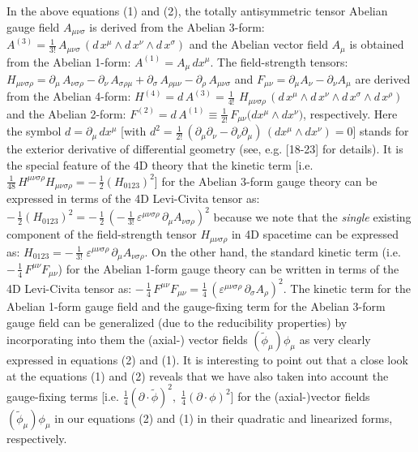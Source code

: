 \documentclass[12pt]{article}
\begin{document}
In the above equations (1) and (2), the totally antisymmetric tensor Abelian gauge field $A_{\mu\nu\sigma}$ is derived from the Abelian 3-form:
$A^{(3)} = \frac{1}{3!}\,A_{\mu\nu\sigma}\,(d\,x^\mu \wedge d\,x^\nu \wedge d\, x^\sigma)$ and the Abelian vector field $A_\mu$ is obtained
from the Abelian 1-form:  $A^{(1)} = A_\mu\, dx^\mu $. The field-strength tensors: $H_{\mu \nu \sigma \rho} = \partial_\mu\, A_{\nu\sigma\rho} - \partial_\nu\,
 A_{\sigma\rho \mu } + \partial_\sigma\, A_{\rho \mu \nu }  - \partial_\rho \,A_{\mu \nu \sigma }$ and $F_{\mu\nu}  = \partial_\mu A_\nu - \partial_\nu A_\mu $
 are derived from the Abelian 4-form: $H^{(4)} = d\, A^{(3)} 
= \frac{1}{4!}\,\, H_{\mu \nu \sigma\rho}\, ( d\,x^\mu \wedge d\,x^\nu \wedge d\, x^\sigma \wedge d\, x^\rho)$ and the 
Abelian 2-form: $F^{(2)} = d\, A^{(1)} \equiv \frac{1}{2!}\, F_{\mu\nu} \big(dx^\mu \wedge dx^\nu \big)$, respectively. Here the symbol $d = \partial_\mu \, dx^\mu$ 
[with $d^2 = \frac{1}{2!}\, (\partial_\mu \partial_\nu - \partial_\nu \partial_\mu)\, (dx^\mu \wedge dx^\nu) = 0$]
 stands for the exterior derivative of differential geometry (see, e.g. [18-23] for details). It is the special feature of the 4D theory
 that the kinetic term [i.e. $\frac{1}{48}\, H^{\mu\nu\sigma\rho} H_{\mu\nu\sigma\rho}  = -\, \frac{1}{2} (H_{0123})^2$] for the 
Abelian 3-form gauge theory can be expressed in terms of the 4D Levi-Civita tensor as:  $-\, \frac{1}{2} (H_{0123})^2 = -\, \frac{1}{2}\,
(-\, \frac{1}{3!} \, \varepsilon^{\mu\nu\sigma\rho}\, \partial_\mu A_{\nu\sigma\rho} )^2$ because we note that the {\it single} existing
component of the field-strength tensor $H_{\mu \nu \sigma\rho}$ in 4D spacetime  can be expressed as: $H_{0123} 
= -\,\frac{1}{3!}\; \varepsilon^{\mu\nu\sigma\rho}\, \partial_\mu A_{\nu\sigma\rho}$. On the other hand, the standard kinetic term 
(i.e. $-\, \frac{1}{4}\, F^{\mu\nu} F_{\mu\nu} $) for the
Abelian 1-form gauge theory can be written in terms of the 4D Levi-Civita tensor as: $ -\, \frac{1}{4}\, F^{\mu\nu} F_{\mu\nu} = \frac{1}{4}\,
(\varepsilon^{\mu\nu\sigma\rho} \,\partial_\sigma A_\rho )^2$. The kinetic term for the Abelian 1-form gauge field and the 
gauge-fixing term for the Abelian 3-form gauge field can be generalized (due to the reducibility properties) 
by incorporating into them the (axial-) vector fields
$(\tilde \phi_\mu) \phi_\mu$ as very clearly expressed in equations (2) and (1). It is interesting to point out that a close look at the
equations (1) and (2) reveals that we have also taken into account the gauge-fixing terms [i.e. $\frac{1}{4}   (\partial \cdot \tilde \phi )^2, 
\; \frac{1}{4}  (\partial \cdot  \phi)^2 $] for the (axial-)vector fields $(\tilde \phi_\mu)\phi_\mu $ in our equations (2) and (1)
in their quadratic and linearized forms, respectively.  
\end{document}
